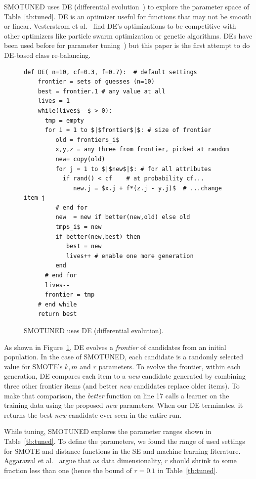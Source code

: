 \documentclass[10pt,conference]{IEEEtran}
\theoremstyle{break}
\theoremstyle{break}
\begin{document}
 
SMOTUNED uses DE (differential evolution~\cite{storn1997differential}) to explore the parameter space of
Table~\ref{tb:tuned}.  DE is an
optimizer useful for functions that may not be smooth or linear.  Vesterstrom et al.~\cite{Vesterstrom04} find   DE's optimizations to be  competitive with other optimizers like 
   particle swarm optimization or genetic algorithms.
   DEs have been used before for   parameter tuning~\cite{omran2005differential, chiha2012tuning,fu2016tuning,fu2017easy, agrawal2016wrong}) but this paper is  the first attempt to do
   DE-based class re-balancing.

\begin{figure}[!htbp]
\scriptsize
\begin{lstlisting}[mathescape,linewidth=8.2cm,frame=r,numbers=right]
  def DE( n=10, cf=0.3, f=0.7):  # default settings
    frontier = sets of guesses (n=10)
    best = frontier.1 # any value at all
    lives = 1
    while(lives$--$ > 0): 
      tmp = empty
      for i = 1 to $|$frontier$|$: # size of frontier
         old = frontier$_i$
         x,y,z = any three from frontier, picked at random
         new= copy(old)  
         for j = 1 to $|$new$|$: # for all attributes
           if rand() < cf    # at probability cf...
              new.j = $x.j + f*(z.j - y.j)$  # ...change item j
         # end for
         new  = new if better(new,old) else old
         tmp$_i$ = new 
         if better(new,best) then
            best = new
            lives++ # enable one more generation
         end                  
      # end for
      lives--
      frontier = tmp
    # end while
    return best
\end{lstlisting}
\caption{SMOTUNED uses DE (differential evolution).}
\label{fig:pseudo_DE}  
\end{figure}


As shown in Figure~\ref{fig:pseudo_DE}, DE evolves a \textit{frontier} of
candidates from an initial population. In the case of SMOTUNED,
each  candidate is a randomly selected value for SMOTE's $k, m$ and $r$ parameters.
 To evolve the frontier, within each generation,
 DE compares each item to a {\em new} candidate generated
 by combining three other frontier items (and better {\em new} candidates replace
 older items). 
 To make that comparison, the {\em better} function on line 17 calls a learner on the training data using the proposed {\em new} parameters.
 When our DE  terminates, it returns the best {\em new} candidate ever seen in the entire run.
 
 While tuning, SMOTUNED explores 
the parameter ranges shown  in  Table~\ref{tb:tuned}. To define
the parameters, we found the range of used settings for SMOTE and distance functions
in the   SE and machine learning  literature.  Aggarawal et al.~\cite{aggarwal2001surprising}
argue that as data dimensionality, $r$ should shrink to some fraction less than one
(hence the bound of $r=0.1$ in Table~\ref{tb:tuned}. 
\end{document}

